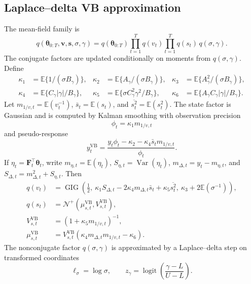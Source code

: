 \documentclass[nojss,noheadings]{jss}
\renewcommand{\E}{\mathbb{E}}
\newcommand{\Var}{\operatorname{Var}}
\newcommand{\logit}{\operatorname{logit}}
\newcommand{\vect}[1]{\bm{#1}}
\newcommand{\mat}[1]{\mathbf{#1}}
\newcommand{\TNp}{\mathcal{N}^{+}}
\newcommand{\GIG}{\operatorname{GIG}}
\begin{document}
\subsection{Laplace--delta VB approximation}

The mean-field family is
\begin{equation}
q(\vect{\theta}_{0:T},\vect{v},\vect{s},\sigma,\gamma)
=q(\vect{\theta}_{0:T})\prod_{t=1}^Tq(v_t)\prod_{t=1}^Tq(s_t)\,q(\sigma,\gamma).
\label{eq:dyn_exdqlm_mf}
\end{equation}
The conjugate factors are updated conditionally on moments from
$q(\sigma,\gamma)$. Define
\begin{align}
\kappa_1 &= \E\{1/(\sigma B_\gamma)\},&
\kappa_2 &= \E\{A_\gamma/(\sigma B_\gamma)\},&
\kappa_3 &= \E\{A_\gamma^2/(\sigma B_\gamma)\},\\
\kappa_4 &= \E\{C_\gamma|\gamma|/B_\gamma\},&
\kappa_5 &= \E\{\sigma C_\gamma^2\gamma^2/B_\gamma\},&
\kappa_6 &= \E\{A_\gamma C_\gamma|\gamma|/B_\gamma\}.
\label{eq:dyn_exdqlm_kappa}
\end{align}
Let $m_{1/v,t}=\E(v_t^{-1})$, $\bar s_t=\E(s_t)$, and
$\overline{s_t^2}=\E(s_t^2)$. The state factor is Gaussian and is computed by Kalman
smoothing with observation precision
\begin{equation}
\phi_t=\kappa_1m_{1/v,t}
\end{equation}
and pseudo-response
\begin{equation}
y_t^{\mathrm{VB}}
=
\frac{
y_t\phi_t-\kappa_2-\kappa_4\bar s_t m_{1/v,t}
}{\phi_t}.
\label{eq:dyn_exdqlm_vb_pseudo}
\end{equation}
If $\eta_t=\mat{F}_t^\top\vect{\theta}_t$, write
$m_{\eta,t}=\E(\eta_t)$, $S_{\eta,t}=\Var(\eta_t)$,
$m_{\Delta,t}=y_t-m_{\eta,t}$, and
$S_{\Delta,t}=m_{\Delta,t}^2+S_{\eta,t}$. Then
\begin{align}
q(v_t)&=\GIG\left(
\frac{1}{2},\
\kappa_1S_{\Delta,t}-2\kappa_4m_{\Delta,t}\bar s_t+\kappa_5\overline{s_t^2},\
\kappa_3+2\E(\sigma^{-1})
\right),\\
q(s_t)&=\TNp(\mu_{s,t}^{\mathrm{VB}},V_{s,t}^{\mathrm{VB}}),\\
V_{s,t}^{\mathrm{VB}}
&=\left(1+\kappa_5m_{1/v,t}\right)^{-1},\\
\mu_{s,t}^{\mathrm{VB}}
&=V_{s,t}^{\mathrm{VB}}
\left(\kappa_4m_{\Delta,t}m_{1/v,t}-\kappa_6\right).
\label{eq:dyn_exdqlm_vb_vs}
\end{align}
The nonconjugate factor $q(\sigma,\gamma)$ is approximated by a
Laplace--delta step on transformed coordinates
\begin{equation}
\ell_\sigma=\log\sigma,\qquad
z_\gamma=\logit\left(\frac{\gamma-L}{U-L}\right).
\label{eq:dyn_exdqlm_ld_transform}
\end{equation}
\end{document}

